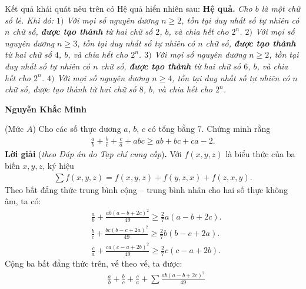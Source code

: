 \begin{multicols}{2}
	Kết quả khái quát nêu trên có Hệ quả hiển nhiên sau:
	\vskip 0.05cm
	\textbf{\color{thachthuctoanhoc}Hệ quả.} \textit{Cho $b$ là một chữ số lẻ. Khi đó:
	\vskip 0.05cm
	$1)$ Với mọi số nguyên dương $n \ge 2$, tồn tại duy nhất số tự nhiên có $n$ chữ số, \textbf{\color{thachthuctoanhoc}được tạo thành} từ hai chữ số $2$, $b$, và chia hết cho $2^n$.
	\vskip 0.05cm 
	$2)$ Với mọi số nguyên dương $n \ge 3$, tồn tại duy nhất số tự nhiên có $n$ chữ số, \textbf{\color{thachthuctoanhoc}được tạo thành} từ hai chữ số $4$, $b$, và chia hết cho $2^n$.
	\vskip 0.05cm 
	$3)$ Với mọi số nguyên dương $n \ge 2$, tồn tại duy nhất số tự nhiên có $n$ chữ số, \textbf{\color{thachthuctoanhoc}được tạo thành} từ hai chữ số $6$, $b$, và chia hết cho $2^n$.
	\vskip 0.05cm 
	$4)$ Với mọi số nguyên dương $n \ge 4$, tồn tại duy nhất số tự nhiên có $n$ chữ số, được tạo thành từ hai chữ số $8$, $b$, và chia hết cho $2^n$.}
	\begin{flushright}
		\textbf{\color{thachthuctoanhoc}Nguyễn Khắc Minh}
	\end{flushright}
	{}
	(Mức $A$) Cho các số thực dương $a$, $b$, $c$ có tổng bằng $7$. Chứng minh rằng
	\begin{align*}
		\frac{a}{b} + \frac{b}{c} + \frac{c}{a} + abc \ge ab + bc + ca - 2.
	\end{align*}
	\textbf{\color{thachthuctoanhoc}Lời giải} (\textit{theo Đáp án do Tạp chí cung cấp})\textbf{\color{thachthuctoanhoc}.}
	\vskip 0.05cm
	Với $f\left( {x,y,z} \right)$  là biểu thức của ba biến $x, y, z$, ký hiệu
	\begin{align*}
		\sum {f\!\left( {x,y,z} \right)}  \!=\! f\!\left( {x,y,z} \right) \!+\! f\!\left( {y,z,x} \right) \!+\! f\!\left( {z,x,y} \right)\!.
	\end{align*}
	Theo bất đẳng thức trung bình cộng -- trung bình nhân cho hai số thực không âm, ta có:
	\begin{align*}
		&\frac{a}{b} + \frac{{ab{{\left( {a - b + 2c} \right)}^2}}}{{49}} \ge \frac{2}{7}a\left( {a - b + 2c} \right).\\
		&\frac{b}{c} + \frac{{bc{{\left( {b - c + 2a} \right)}^2}}}{{49}} \ge \frac{2}{7}b\left( {b - c + 2a} \right).\\
		&\frac{c}{a} + \frac{{ca{{\left( {c - a + 2b} \right)}^2}}}{{49}} \ge \frac{2}{7}c\left( {c - a + 2b} \right).
	\end{align*}
	Cộng ba bất đẳng thức trên, vế theo vế, ta được:
	\begin{align*}
		&\frac{a}{b} + \frac{b}{c} + \frac{c}{a} + \sum {\frac{{ab{{\left( {a - b + 2c} \right)}^2}}}{{49}}}  \\

\end{align*}
\end{multicols}

